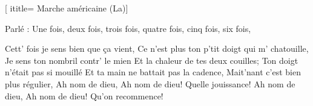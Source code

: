  [
ititle= {Marche américaine (La)}]

\beginverse
Parlé :
Une fois, deux fois, trois fois,
quatre fois, cinq fois, six fois,
\endverse

\beginverse
Cett' fois je sens bien que ça vient,
Ce n'est plus ton p'tit doigt qui m' chatouille,
Je sens ton nombril contr' le mien
Et la chaleur de tes deux couilles;
Ton doigt n'était pas si mouillé
Et ta main ne battait pas la cadence,
Mait'nant c'est bien plus régulier,
Ah nom de dieu, Ah nom de dieu!
Quelle jouissance!
Ah nom de dieu, Ah nom de dieu!
Qu'on recommence!
\endverse

\endsong
